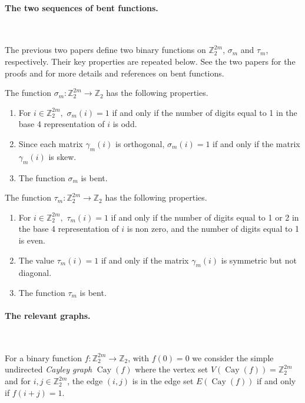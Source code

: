 \documentclass[11pt,a4paper]{jacodesmath}
\newcommand{\mb}[1]{\mathbb{#1}}
\newcommand{\Cay}{\operatorname{Cay}}
\newcommand{\Z}{\mb{Z}}
\newcommand{\To}{\rightarrow}
\begin{document}
\paragraph*{The two sequences of bent functions.}
\label{sec-Bent}

~

The previous two papers \cite{Leo14Constructions,Leo15Twin}
define two binary functions  on $\Z_2^{2 m}$, $\sigma_m$ and $\tau_m$, respectively.
Their key properties are repeated below.
See the two papers for the proofs and for more details and references on bent functions.

The function $\sigma_m : \Z_2^{2 m} \To \Z_2$ has the following properties.
\begin{enumerate}
 \item
For $i \in \Z_2^{2m},$ $\sigma_m(i) = 1$ if and only if the number of
digits equal to 1 in  the base 4 representation of $i$ is odd.
 \item
Since each matrix $\gamma_m(i)$ is orthogonal, $\sigma_m(i) = 1$ if and only if the matrix
$\gamma_m(i)$ is skew.
 \item
The function $\sigma_m$ is bent.
\end{enumerate}

The function $\tau_m : \Z_2^{2 m} \To \Z_2$ has the following properties.
\begin{enumerate}
 \item
For $i \in \Z_2^{2m},$ $\tau_m(i) = 1$ if and only if the number of digits equal to 1 or 2 in the
base 4
representation of $i$ is non zero, and the number of digits equal to 1 is even.
 \item
The value $\tau_m(i) = 1$ if and only if the matrix $\gamma_m(i)$ is symmetric but not diagonal.
 \item
The function $\tau_m$ is bent.
\end{enumerate}

\paragraph*{The relevant graphs.}
\label{sec-Graphs}

~

For a binary function $f : \Z_2^{2 m} \To \Z_2$, with $f(0)=0$ we consider the simple undirected
\emph{Cayley graph} $\Cay(f)$  \cite[3.1]{BerC99}
where the vertex set $V(\Cay(f)) = \Z_2^{2 m}$ and for $i,j \in \Z_2^{2 m}$, the edge $(i,j)$ is in
the edge set $E(\Cay(f))$ if and only if $f(i+j)=1$.
\end{document}
